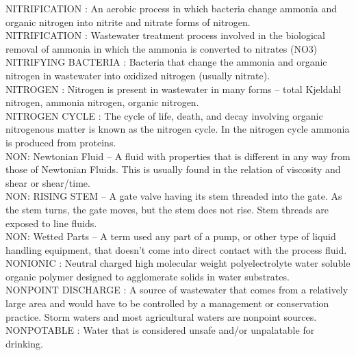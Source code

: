 NITRIFICATION :  An aerobic process in which bacteria change ammonia and organic nitrogen into nitrite and nitrate forms of nitrogen.\\
\vspace{0.15cm}
NITRIFICATION :  Wastewater treatment process involved in the biological removal of ammonia in which the ammonia is converted to nitrates (NO3)\\
\vspace{0.15cm}
NITRIFYING BACTERIA :  Bacteria that change the ammonia and organic nitrogen in wastewater into oxidized nitrogen (usually nitrate).\\
\vspace{0.15cm}
NITROGEN :   Nitrogen is present in wastewater in many forms – total Kjeldahl nitrogen, ammonia nitrogen, organic nitrogen.\\
\vspace{0.15cm}
NITROGEN CYCLE :   The cycle of life, death, and decay involving organic nitrogenous matter is known as the nitrogen cycle. In the nitrogen cycle ammonia is produced from proteins.\\
\vspace{0.15cm}
NON: Newtonian Fluid –  A fluid with properties that is different in any way from those of Newtonian Fluids. This is usually found in the relation of viscosity and shear or shear/time.\\
\vspace{0.15cm}
NON: RISING STEM –  A gate valve having its stem threaded into the gate. As the stem turns, the gate moves, but the stem does not rise. Stem threads are exposed to line fluids.\\
\vspace{0.15cm}
NON: Wetted Parts –  A term used any part of a pump, or other type of liquid handling equipment, that doesn’t come into direct contact with the process fluid.\\
\vspace{0.15cm}
NONIONIC :  Neutral charged high molecular weight polyelectrolyte water soluble organic polymer designed to agglomerate solids in water substrates.\\
\vspace{0.15cm}
NONPOINT DISCHARGE :  A source of wastewater that comes from a relatively large area and would have to be controlled by a management or conservation practice. Storm waters and most agricultural waters are nonpoint sources.\\
\vspace{0.15cm}
NONPOTABLE :  Water that is considered unsafe and/or unpalatable for drinking.\\
